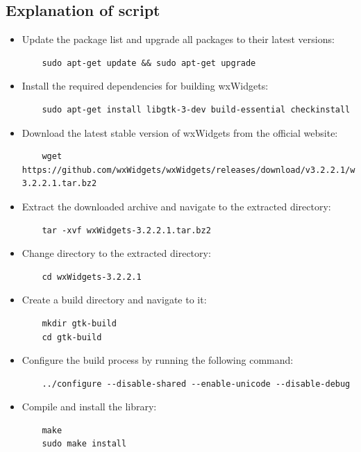 \subsection{Explanation of script}

\begin{itemize}
      \item Update the package list and upgrade all packages to their latest versions:

            \begin{lstlisting}
    sudo apt-get update && sudo apt-get upgrade
    \end{lstlisting}

      \item Install the required dependencies for building wxWidgets:

            \begin{lstlisting}
    sudo apt-get install libgtk-3-dev build-essential checkinstall
    \end{lstlisting}

      \item Download the latest stable version of wxWidgets from the official website:

            \begin{lstlisting}
    wget https://github.com/wxWidgets/wxWidgets/releases/download/v3.2.2.1/wxWidgets-3.2.2.1.tar.bz2
    \end{lstlisting}

      \item Extract the downloaded archive and navigate to the extracted directory:

            \begin{lstlisting}
    tar -xvf wxWidgets-3.2.2.1.tar.bz2
    \end{lstlisting}

      \item Change directory to the extracted directory:

            \begin{lstlisting}
    cd wxWidgets-3.2.2.1
    \end{lstlisting}

      \item Create a build directory and navigate to it:

            \begin{lstlisting}
    mkdir gtk-build
    cd gtk-build
    \end{lstlisting}

      \item Configure the build process by running the following command:

            \begin{lstlisting}
    ../configure --disable-shared --enable-unicode --disable-debug
    \end{lstlisting}

      \item Compile and install the library:

            \begin{lstlisting}
    make
    sudo make install
    \end{lstlisting}

\end{itemize}

